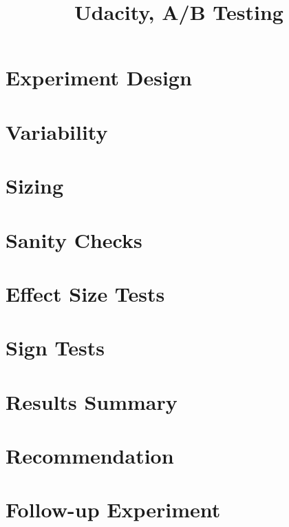\documentclass[12pt,a4paper]{article}
\begin{document}
\title{Udacity, A/B Testing}

\maketitle

\section{Experiment Design}

\section{Variability}

\section{Sizing}

\section{Sanity Checks}

\section{Effect Size Tests}

\section{Sign Tests}

\section{Results Summary}

\section{Recommendation}

\section{Follow-up Experiment}
\end{document}
